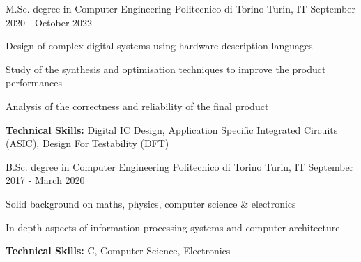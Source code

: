 

\begin{cventries}

  \cventry
    {M.Sc. degree in Computer Engineering} %
    {Politecnico di Torino} %
    {Turin, IT} %
    {September 2020 - October 2022} %
    {
      \begin{cvitems} %
        \item {Design of complex digital systems using hardware description languages}
        \item {Study of the synthesis and optimisation techniques to improve the product performances}
        \item {Analysis of the correctness and reliability of the final product}
        \item {\textbf{Technical Skills:} Digital IC Design, Application Specific Integrated Circuits (ASIC), Design For Testability (DFT)}
      \end{cvitems}
    }
    
  \cventry
    {B.Sc. degree in Computer Engineering} %
    {Politecnico di Torino} %
    {Turin, IT} %
    {September 2017 - March 2020} %
    {
      \begin{cvitems} %
        \item {Solid background on maths, physics, computer science \& electronics}
        \item {In-depth aspects of information processing systems and computer architecture}
        \item {\textbf{Technical Skills:} C, Computer Science, Electronics}
      \end{cvitems}
    }
    
\end{cventries}
